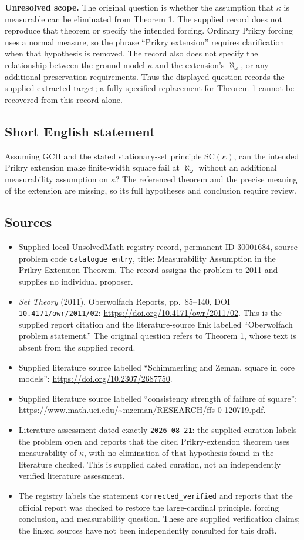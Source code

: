\documentclass[11pt]{article}
\begin{document}
\textbf{Unresolved scope.} The original question is whether the assumption that \(\kappa\) is measurable can be eliminated from Theorem 1. The supplied record does not reproduce that theorem or specify the intended forcing. Ordinary Prikry forcing uses a normal measure, so the phrase ``Prikry extension'' requires clarification when that hypothesis is removed. The record also does not specify the relationship between the ground-model \(\kappa\) and the extension's \(\aleph_\omega\), or any additional preservation requirements. Thus the displayed question records the supplied extracted target; a fully specified replacement for Theorem 1 cannot be recovered from this record alone.
\subsection{Short English statement}
Assuming GCH and the stated stationary-set principle \(\mathrm{SC}(\kappa)\), can the intended Prikry extension make finite-width square fail at \(\aleph_\omega\) without an additional measurability assumption on \(\kappa\)? The referenced theorem and the precise meaning of the extension are missing, so its full hypotheses and conclusion require review.
\subsection{Sources}
\begin{itemize}
\item Supplied local UnsolvedMath registry record, permanent ID \(30001684\), source problem code \texttt{catalogue entry}, title: Measurability Assumption in the Prikry Extension Theorem. The record assigns the problem to 2011 and supplies no individual proposer.
\item \emph{Set Theory} (2011), Oberwolfach Reports, pp.\ 85--140, DOI \texttt{10.4171/owr/2011/02}: \url{https://doi.org/10.4171/owr/2011/02}. This is the supplied report citation and the literature-source link labelled ``Oberwolfach problem statement.'' The original question refers to Theorem 1, whose text is absent from the supplied record.
\item Supplied literature source labelled ``Schimmerling and Zeman, square in core models'': \url{https://doi.org/10.2307/2687750}.
\item Supplied literature source labelled ``consistency strength of failure of square'': \url{https://www.math.uci.edu/~mzeman/RESEARCH/ffs-0-120719.pdf}.
\item Literature assessment dated exactly \texttt{2026-08-21}: the supplied curation labels the problem open and reports that the cited Prikry-extension theorem uses measurability of \(\kappa\), with no elimination of that hypothesis found in the literature checked. This is supplied dated curation, not an independently verified literature assessment.
\item The registry labels the statement \texttt{corrected\_verified} and reports that the official report was checked to restore the large-cardinal principle, forcing conclusion, and measurability question. These are supplied verification claims; the linked sources have not been independently consulted for this draft.
\end{itemize}
\end{document}
